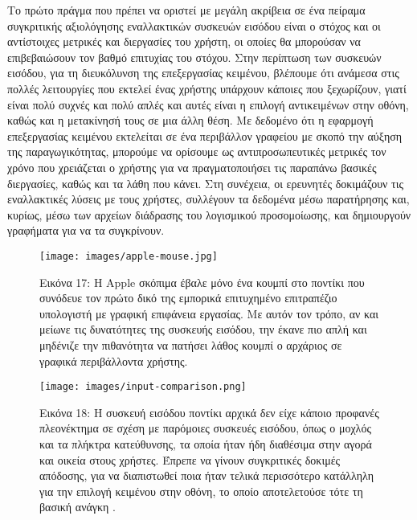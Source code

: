 \documentclass[
]{article}
\begin{document}
Το πρώτο πράγμα που πρέπει να οριστεί με μεγάλη ακρίβεια σε ένα πείραμα
συγκριτικής αξιολόγησης εναλλακτικών συσκευών εισόδου είναι ο στόχος και
οι αντίστοιχες μετρικές και διεργασίες του χρήστη, οι οποίες θα
μπορούσαν να επιβεβαιώσουν τον βαθμό επιτυχίας του στόχου. Στην
περίπτωση των συσκευών εισόδου, για τη διευκόλυνση της επεξεργασίας
κειμένου, βλέπουμε ότι ανάμεσα στις πολλές λειτουργίες που εκτελεί ένας
χρήστης υπάρχουν κάποιες που ξεχωρίζουν, γιατί είναι πολύ συχνές και
πολύ απλές και αυτές είναι η επιλογή αντικειμένων στην οθόνη, καθώς και
η μετακίνησή τους σε μια άλλη θέση. Με δεδομένο ότι η εφαρμογή
επεξεργασίας κειμένου εκτελείται σε ένα περιβάλλον γραφείου με σκοπό την
αύξηση της παραγωγικότητας, μπορούμε να ορίσουμε ως αντιπροσωπευτικές
μετρικές τον χρόνο που χρειάζεται ο χρήστης για να πραγματοποιήσει τις
παραπάνω βασικές διεργασίες, καθώς και τα λάθη που κάνει. Στη συνέχεια,
οι ερευνητές δοκιμάζουν τις εναλλακτικές λύσεις με τους χρήστες,
συλλέγουν τα δεδομένα μέσω παρατήρησης και, κυρίως, μέσω των αρχείων
διάδρασης του λογισμικού προσομοίωσης, και δημιουργούν γραφήματα για να
τα συγκρίνουν.

\leavevmode{}%
\begin{figure}
\hypertarget{fig:apple-mouse}{%
\centering
\texttt{[image: images/apple-mouse.jpg]}
\caption{Εικόνα 17: Η Apple σκόπιμα έβαλε μόνο ένα κουμπί στο ποντίκι
που συνόδευε τον πρώτο δικό της εμπορικά επιτυχημένο επιτραπέζιο
υπολογιστή με γραφική επιφάνεια εργασίας. Με αυτόν τον τρόπο, αν και
μείωνε τις δυνατότητες της συσκευής εισόδου, την έκανε πιο απλή και
μηδένιζε την πιθανότητα να πατήσει λάθος κουμπί ο αρχάριος σε γραφικά
περιβάλλοντα χρήστης.}\label{fig:apple-mouse}
}
\end{figure}

\leavevmode{}%
\begin{figure}
\hypertarget{fig:input-comparison}{%
\centering
\texttt{[image: images/input-comparison.png]}
\caption{Εικόνα 18: Η συσκευή εισόδου ποντίκι αρχικά δεν είχε κάποιο
προφανές πλεονέκτημα σε σχέση με παρόμοιες συσκευές εισόδου, όπως ο
μοχλός και τα πλήκτρα κατεύθυνσης, τα οποία ήταν ήδη διαθέσιμα στην
αγορά και οικεία στους χρήστες. Έπρεπε να γίνουν συγκριτικές δοκιμές
απόδοσης, για να διαπιστωθεί ποια ήταν τελικά περισσότερο κατάλληλη για
την επιλογή κειμένου στην οθόνη, το οποίο αποτελετούσε τότε τη βασική
ανάγκη .}\label{fig:input-comparison}
}
\end{figure}
\end{document}
